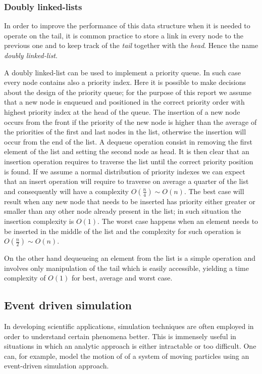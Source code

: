 \documentclass{article}
\begin{document}
\subsubsection{Doubly linked-lists} \label{listbackground}
In order to improve the performance of this data structure when it is needed to operate on the tail, it is common practice to store a link in every node to the previous one and to keep track of the \textit{tail} together with the \textit{head}. Hence the name \textit{doubly linked-list}.

A doubly linked-list can be used to implement a priority queue. In such case every node contains also a priority index. Here it is possible to make decisions about the design of the priority queue; for the purpose of this report we assume that a new node is enqueued and positioned in the correct priority order with highest priority index at the head of the queue. The insertion of a new node occurs from the front if the priority of the new node is higher than the average of the priorities of the first and last nodes in the list, otherwise the insertion will occur from the end of the list. A dequeue operation consist in removing the first element of the list and setting the second node as head.
It is then clear that an insertion operation requires to traverse the list until the correct priority position is found. If we assume a normal distribution of priority indexes we can expect that an insert operation will require to traverse on average a quarter of the list and consequently will have a complexity $O(\frac{n}{4}) \sim O(n)$. The best case will result when any new node that needs to be inserted has priority either greater or smaller than any other node already present in the list; in such situation the insertion complexity is $O(1)$. The worst case happens when an element needs to be inserted in the middle of the list and the complexity for such operation is $O(\frac{n}{2}) \sim O(n)$.

On the other hand dequeueing an element from the list is a simple operation and involves only manipulation of the tail which is easily accessible, yielding a time complexity of $O(1)$ for best, average and worst case.

\subsection{Event driven simulation}
In developing scientific applications, simulation techniques are often employed in order to understand certain phenomena better. This is immensely useful in situations in which an analytic approach is either intractable or too difficult. One can, for example, model the motion of of a system of moving particles using an event-driven simulation approach.
\end{document}
